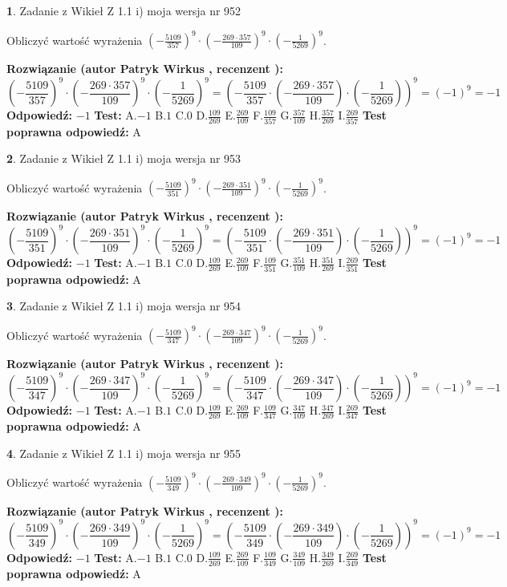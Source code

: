 \documentclass[12pt, a4paper]{article}
\theoremstyle{definition} %
\newtheorem{zad}{}
\newcommand{\zadStart}[1]{\begin{zad}#1\newline}
\newcommand{\zadStop}{\end{zad}}
\newcommand{\rozwStart}[2]{\noindent \textbf{Rozwiązanie (autor #1 , recenzent #2): }\newline}
\newcommand{\rozwStop}{\newline}
\newcommand{\odpStart}{\noindent \textbf{Odpowiedź:}\newline}
\newcommand{\odpStop}{\newline}
\newcommand{\testStart}{\noindent \textbf{Test:}\newline}
\newcommand{\testStop}{\newline}
\newcommand{\kluczStart}{\noindent \textbf{Test poprawna odpowiedź:}\newline}
\newcommand{\kluczStop}{\newline}
\begin{document}
\zadStart{Zadanie z Wikieł Z 1.1 i) moja wersja nr 952}

Obliczyć wartość wyrażenia $(-\frac{5109}{357})^{9} \cdot (-\frac{269 \cdot 357}{109})^{9} \cdot (-\frac{1}{5269})^{9}$.
\zadStop
\rozwStart{Patryk Wirkus}{}
$$(-\frac{5109}{357})^{9} \cdot (-\frac{269 \cdot 357}{109})^{9} \cdot (-\frac{1}{5269})^{9} = (-\frac{5109}{357} \cdot (-\frac{269 \cdot 357}{109}) \cdot (-\frac{1}{5269}))^{9} = (-1)^{9} = -1$$
\rozwStop
\odpStart
$-1$
\odpStop
\testStart
A.$-1$ B.$1$ C.$0$ D.$\frac{109}{269}$ E.$\frac{269}{109}$
F.$\frac{109}{357}$ G.$\frac{357}{109}$
H.$\frac{357}{269}$
I.$\frac{269}{357}$
\testStop
\kluczStart
A
\kluczStop



\zadStart{Zadanie z Wikieł Z 1.1 i) moja wersja nr 953}

Obliczyć wartość wyrażenia $(-\frac{5109}{351})^{9} \cdot (-\frac{269 \cdot 351}{109})^{9} \cdot (-\frac{1}{5269})^{9}$.
\zadStop
\rozwStart{Patryk Wirkus}{}
$$(-\frac{5109}{351})^{9} \cdot (-\frac{269 \cdot 351}{109})^{9} \cdot (-\frac{1}{5269})^{9} = (-\frac{5109}{351} \cdot (-\frac{269 \cdot 351}{109}) \cdot (-\frac{1}{5269}))^{9} = (-1)^{9} = -1$$
\rozwStop
\odpStart
$-1$
\odpStop
\testStart
A.$-1$ B.$1$ C.$0$ D.$\frac{109}{269}$ E.$\frac{269}{109}$
F.$\frac{109}{351}$ G.$\frac{351}{109}$
H.$\frac{351}{269}$
I.$\frac{269}{351}$
\testStop
\kluczStart
A
\kluczStop



\zadStart{Zadanie z Wikieł Z 1.1 i) moja wersja nr 954}

Obliczyć wartość wyrażenia $(-\frac{5109}{347})^{9} \cdot (-\frac{269 \cdot 347}{109})^{9} \cdot (-\frac{1}{5269})^{9}$.
\zadStop
\rozwStart{Patryk Wirkus}{}
$$(-\frac{5109}{347})^{9} \cdot (-\frac{269 \cdot 347}{109})^{9} \cdot (-\frac{1}{5269})^{9} = (-\frac{5109}{347} \cdot (-\frac{269 \cdot 347}{109}) \cdot (-\frac{1}{5269}))^{9} = (-1)^{9} = -1$$
\rozwStop
\odpStart
$-1$
\odpStop
\testStart
A.$-1$ B.$1$ C.$0$ D.$\frac{109}{269}$ E.$\frac{269}{109}$
F.$\frac{109}{347}$ G.$\frac{347}{109}$
H.$\frac{347}{269}$
I.$\frac{269}{347}$
\testStop
\kluczStart
A
\kluczStop



\zadStart{Zadanie z Wikieł Z 1.1 i) moja wersja nr 955}

Obliczyć wartość wyrażenia $(-\frac{5109}{349})^{9} \cdot (-\frac{269 \cdot 349}{109})^{9} \cdot (-\frac{1}{5269})^{9}$.
\zadStop
\rozwStart{Patryk Wirkus}{}
$$(-\frac{5109}{349})^{9} \cdot (-\frac{269 \cdot 349}{109})^{9} \cdot (-\frac{1}{5269})^{9} = (-\frac{5109}{349} \cdot (-\frac{269 \cdot 349}{109}) \cdot (-\frac{1}{5269}))^{9} = (-1)^{9} = -1$$
\rozwStop
\odpStart
$-1$
\odpStop
\testStart
A.$-1$ B.$1$ C.$0$ D.$\frac{109}{269}$ E.$\frac{269}{109}$
F.$\frac{109}{349}$ G.$\frac{349}{109}$
H.$\frac{349}{269}$
I.$\frac{269}{349}$
\testStop
\kluczStart
A
\kluczStop
\end{document}
